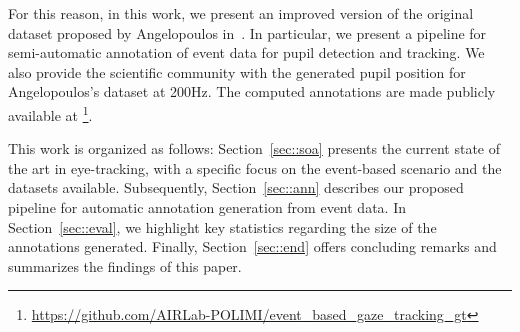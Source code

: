 For this reason, in this work, we present an improved version of the original dataset proposed by Angelopoulos in~\cite{angelopoulos2020event}. In particular, we present a pipeline for semi-automatic annotation of event data for pupil detection and tracking. We also provide the scientific community with the generated pupil position for Angelopoulos's dataset at 200Hz. The computed annotations are made publicly available at \footnote{\url{https://github.com/AIRLab-POLIMI/event_based_gaze_tracking_gt}}.

This work is organized as follows: Section~\ref{sec::soa} presents the current state of the art in eye-tracking, with a specific focus on the event-based scenario and the datasets available. Subsequently, Section~\ref{sec::ann} describes our proposed pipeline for automatic annotation generation from event data. In Section~\ref{sec::eval}, we highlight key statistics regarding the size of the annotations generated. Finally, Section~\ref{sec::end} offers concluding remarks and summarizes the findings of this paper.